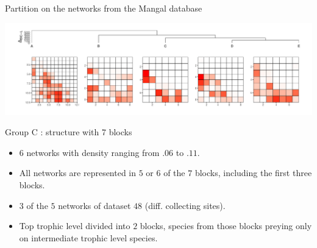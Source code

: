 \documentclass[compress,10pt]{beamer}
\begin{document}
\begin{frame}{Partition on the networks from the Mangal database}

\includegraphics[width=\hsize]{plots/rmangal_pi_newpen_dend_meso}
    

\alert{Group C} : structure with 7 blocks 
\begin{itemize}
 \item $6$ networks with density ranging from $.06$ to $.11$. 
 \item All networks are represented in $5$ or $6$ of the $7$ blocks, including the first three blocks. 
 \item  $3$ of the $5$ networks of dataset $48$ (diff. collecting sites). 
 \item Top trophic level divided into $2$ blocks, species from those blocks preying only on intermediate trophic level species. 
 
\end{itemize}

\end{frame}
\end{document}
